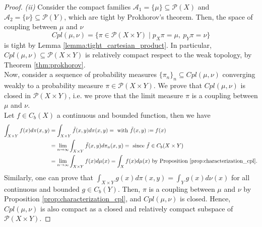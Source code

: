 \documentclass[../main.tex]{subfiles}
\begin{document}
\begin{proof}
    \noindent
    \textit{(ii)} Consider the compact families $\mathcal{A}_1 = \{\mu\}\subseteq\mathcal{P}(X)$ and $\mathcal{A}_2 = \{\nu\}\subseteq\mathcal{P}(Y)$, which are tight by Prokhorov's theorem. Then, the space of coupling between $\mu$ and $\nu$ $$Cpl(\mu, \nu) =\{\pi\in\mathcal{P}(X\times Y) \mid p_X\pi=\mu, \ p_Y\pi=\nu\}$$ is tight by Lemma \ref{lemma:tight_cartesian_product}.
    In particular, $Cpl(\mu, \nu)\subseteq\mathcal{P}(X\times Y)$ is relatively compact respect to the weak topology, by Theorem \ref{thm:prokhorov}.\\
    Now, consider a sequence of probability measures $\{\pi_n\}_n\subseteq Cpl(\mu, \nu)$ converging weakly to a probability measure $\pi\in\mathcal{P}(X\times Y)$. We prove that $Cpl(\mu, \nu)$ is closed in $\mathcal{P}(X\times Y)$, i.e. we prove that the limit measure $\pi$ is a coupling between $\mu$ and $\nu$. \\
    Let $f \in C_b(X)$ a continuous and bounded function, then we have
    \begin{align*}
        \int_{X\times Y} f(x) d\pi(x,y) &= \int_{X\times Y} \tilde f(x, y)d\pi(x,y) = \text{ with } \tilde f(x,y):=f(x) \\
        &= \lim_{n\to\infty} \int_{X\times Y} \tilde f(x,y)d\pi_n(x,y) = \text{ since } \tilde f\in C_b(X\times Y) \\
        &= \lim_{n\to\infty} \int_{X\times Y} f(x)d\mu(x) 
        = \int_X f(x)d\mu(x) \text{ by Proposition \ref{prop:characterization_cpl}.} 
    \end{align*}
    Similarly, one can prove that $\int_{X\times Y} g(x) d\pi(x,y) = \int_Y g(x)d\nu(x)$ for all continuous and bounded $g\in C_b(Y)$. Then, $\pi$ is a coupling between $\mu$ and $\nu$ by Proposition \ref{prop:characterization_cpl}, and $Cpl(\mu, \nu)$ is closed. Hence, $Cpl(\mu, \nu)$ is also compact as a closed and relatively compact subspace of $\mathcal{P}(X\times Y)$.
\end{proof}
\end{document}
